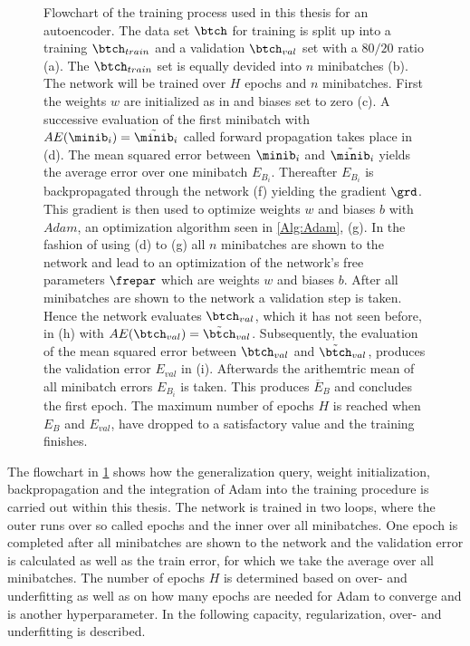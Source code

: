 \begin{figure}[htbp!]
	\centering
	
	\caption{\footnotesize Flowchart of the training process used in this thesis for an autoencoder. The data set \(\btch\) for training is split up into a training \(\btch_{train}\) and a validation \(\btch_{val}\) set with a \(80/20\) ratio (a). The \(\btch_{train}\) set is equally devided into \(n\) minibatches (b). The network will be trained over \(H\) epochs and \(n\) minibatches. First the weights \(w\) are initialized as in \cite{LeCun98} and biases set to zero (c). A successive evaluation of the first minibatch with \(AE(\minib_{i})=\tilde{\minib}_{i}\) called forward propagation takes place in (d). The mean squared error between \(\minib_{i}\) and \(\tilde{\minib}_{i}\) yields the average error over one minibatch \(E_{B_i}\). Thereafter \(E_{B_i}\) is backpropagated through the network (f) yielding the gradient \(\grd\). This gradient is then used to optimize weights \(w\) and biases \(b\) with  \(Adam\), an optimization algorithm seen in \cref{Alg:Adam}, (g). In the fashion of using (d) to (g) all \(n\) minibatches are shown to the network and lead to an optimization of the network's free parameters \(\frepar\) which are weights \(w\) and biases \(b\). After all minibatches are shown to the network a validation step is taken. Hence the network evaluates \(\btch_{val}\), which it has not seen before, in (h) with \(AE(\btch_{val})=\tilde{\btch}_{val}\). Subsequently, the evaluation of the mean squared error between \(\btch_{val}\) and \(\tilde{\btch}_{val}\), produces the validation error \(E_{val}\) in (i). Afterwards the arithemtric mean of all minibatch errors \(E_{B_i}\) is taken. This produces \(\overline{E}_B\) and concludes the first epoch. The maximum number of epochs \(H\) is reached when \(E_B\) and \(E_{val}\), have dropped to a satisfactory value and the training finishes.}
	\label{Fig:Training}
\end{figure}\noindent
The flowchart in \cref{Fig:Training} shows how the generalization query, weight initialization, backpropagation and the integration of Adam into the training procedure is carried out within this thesis. The network is trained in two loops, where the outer runs over so called epochs and the inner over all minibatches. One epoch is completed after all minibatches are shown to the network and the validation error is calculated as well as the train error, for which we take the average over all minibatches. The number of epochs \(H\) is determined based on over- and underfitting as well as on how many epochs are needed for Adam to converge and is another hyperparameter. In the following capacity, regularization, over- and underfitting is described.\\
